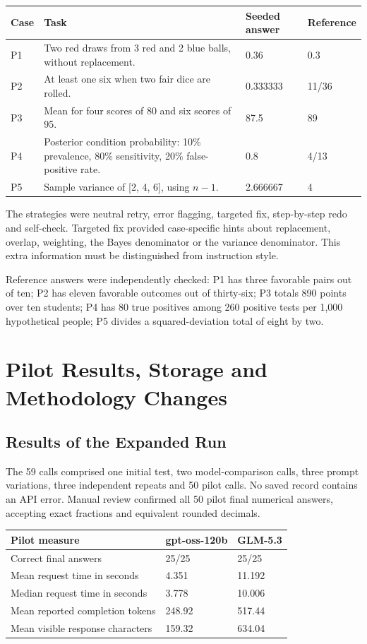 \documentclass[11pt,letterpaper]{article}
\begin{document}
{\small
\renewcommand{\arraystretch}{1.20}
\begin{tabularx}{\linewidth}{Y{0.35}Y{2.05}Y{0.80}Y{0.80}}
\toprule
{}
\textbf{Case} & \textbf{Task} & \textbf{Seeded answer} & \textbf{Reference} \\
\midrule
P1 & Two red draws from 3 red and 2 blue balls, without replacement. & 0.36 & 0.3 \\
P2 & At least one six when two fair dice are rolled. & 0.333333 & 11/36 \\
P3 & Mean for four scores of 80 and six scores of 95. & 87.5 & 89 \\
P4 & Posterior condition probability: 10\% prevalence, 80\% sensitivity, 20\% false-positive rate. & 0.8 & 4/13 \\
P5 & Sample variance of [2, 4, 6], using $n-1$. & 2.666667 & 4 \\
\bottomrule
\end{tabularx}}

The strategies were neutral retry, error flagging, targeted fix, step-by-step redo and self-check. Targeted fix provided case-specific hints about replacement, overlap, weighting, the Bayes denominator or the variance denominator. This extra information must be distinguished from instruction style.

Reference answers were independently checked: P1 has three favorable pairs out of ten; P2 has eleven favorable outcomes out of thirty-six; P3 totals 890 points over ten students; P4 has 80 true positives among 260 positive tests per 1,000 hypothetical people; P5 divides a squared-deviation total of eight by two.

\clearpage
\section{Pilot Results, Storage and Methodology Changes}
\subsection*{Results of the Expanded Run}
The 59 calls comprised one initial test, two model-comparison calls, three prompt variations, three independent repeats and 50 pilot calls. No saved record contains an API error. Manual review confirmed all 50 pilot final numerical answers, accepting exact fractions and equivalent rounded decimals.

{\small
\renewcommand{\arraystretch}{1.20}
\begin{tabularx}{\linewidth}{Y{1.45}Y{0.775}Y{0.775}}
\toprule
{}
\textbf{Pilot measure} & \textbf{gpt-oss-120b} & \textbf{GLM-5.3} \\
\midrule
Correct final answers & 25/25 & 25/25 \\
Mean request time in seconds & 4.351 & 11.192 \\
Median request time in seconds & 3.778 & 10.006 \\
Mean reported completion tokens & 248.92 & 517.44 \\
Mean visible response characters & 159.32 & 634.04 \\
\bottomrule
\end{tabularx}}
\end{document}
